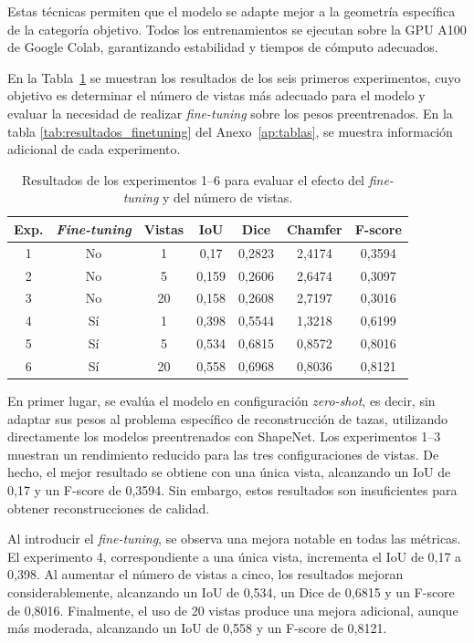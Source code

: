 \documentclass[10pt,a4paper]{report}
\begin{document}
Estas técnicas permiten que el modelo se adapte mejor a la geometría específica de la categoría objetivo. Todos los entrenamientos se ejecutan sobre la GPU A100 de Google Colab, garantizando estabilidad y tiempos de cómputo adecuados. 

En la Tabla~\ref{tab:tabla_resultados_finetuning} se muestran los resultados de los seis primeros experimentos, cuyo objetivo es determinar el número de vistas más adecuado para el modelo y evaluar la necesidad de realizar \textit{fine-tuning} sobre los pesos preentrenados. En la tabla \ref{tab:resultados_finetuning} del Anexo~\ref{ap:tablas}, se muestra información adicional de cada experimento.

\begin{table}[H]
  \centering
  \begin{tabular}{ccccccc}
    \toprule
    Exp. & \textit{Fine-tuning} & Vistas & IoU & Dice & Chamfer & F-score \\
    \midrule
    1 & No & 1  & 0,17  & 0,2823 & 2,4174 & 0,3594 \\
    2 & No & 5  & 0,159 & 0,2606 & 2,6474 & 0,3097 \\
    3 & No & 20 & 0,158 & 0,2608 & 2,7197 & 0,3016 \\
    4 & Sí & 1  & 0,398 & 0,5544 & 1,3218 & 0,6199 \\
    5 & Sí & 5  & 0,534 & 0,6815 & 0,8572 & 0,8016 \\
    6 & Sí & 20 & 0,558 & 0,6968 & 0,8036 & 0,8121 \\
    \bottomrule
  \end{tabular}%
  \caption{Resultados de los experimentos 1--6 para evaluar el efecto del \textit{fine-tuning} y del número de vistas.}
  \label{tab:tabla_resultados_finetuning}
\end{table}

En primer lugar, se evalúa el modelo en configuración \textit{zero-shot}, es decir, sin adaptar sus pesos al problema específico de reconstrucción de tazas, utilizando directamente los modelos preentrenados con ShapeNet. Los experimentos 1--3 muestran un rendimiento reducido para las tres configuraciones de vistas. De hecho, el mejor resultado se obtiene con una única vista, alcanzando un IoU de 0,17 y un F-score de 0,3594. Sin embargo, estos resultados son insuficientes para obtener reconstrucciones de calidad.

Al introducir el \textit{fine-tuning}, se observa una mejora notable en todas las métricas. El experimento 4, correspondiente a una única vista, incrementa el IoU de 0,17 a 0,398. Al aumentar el número de vistas a cinco, los resultados mejoran considerablemente, alcanzando un IoU de 0,534, un Dice de 0,6815 y un F-score de 0,8016. Finalmente, el uso de 20 vistas produce una mejora adicional, aunque más moderada, alcanzando un IoU de 0,558 y un F-score de 0,8121.
\end{document}

